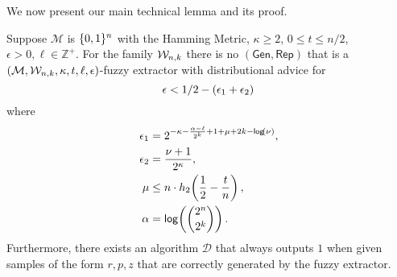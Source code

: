 \noindent
We now present our main technical lemma and its proof. 
\begin{lemma}
\label{lem:convert distinguisher}
    Suppose $\mathcal{M}$ is $\{0, 1\}^n$ with the Hamming Metric, $\kappa \geq 2$, $0 \leq t \leq n/2$, $\epsilon > 0, \ell\in\mathbb{Z}^+$. 
For the family $\mathcal{W}_{n,k}$ there is no $(\mathsf{Gen, Rep})$ that is a $(\mathcal{M},\mathcal{W}_{n,k},\kappa, t, \ell, \epsilon)$-fuzzy extractor with distributional advice for
\[
\epsilon<1/2-\left(\epsilon_1+\epsilon_2\right)\\
\]
where 
\begin{align*}
\epsilon_1&= 2^{-\kappa-\frac{\alpha-\ell}{2^k}+1+\mu+2k-\mathsf{log}\!\left(\nu\right)},\\
\epsilon_2&=\frac{\nu+1}{2^{\kappa}},\\
  \mu &\leq n \cdot h_2\!\left(\frac{1}{2} - \frac{t}{n}\right),\\
\alpha &= \mathsf{log}\!\left({2^n\choose 2^k}\right).
\end{align*}
Furthermore, there exists an algorithm $\mathcal{D}$ that always outputs $1$ when given samples of the form $r, p, z$ that are correctly generated by the fuzzy extractor.
\end{lemma}

